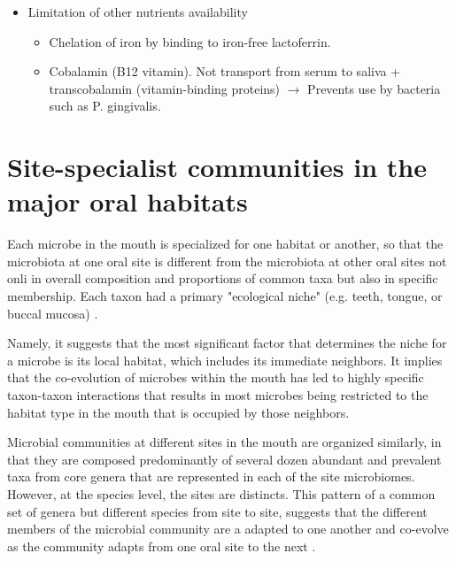 \begin{tcolorbox}[breakable,
    title=Saliva,
    title filled=false,
    colback=blue!5!white,
    colframe=blue!75!black]
\begin{itemize}
\begin{itemize}
        \end{itemize}
        \item Limitation of other nutrients availability
        \begin{itemize}
            \item Chelation of iron by binding to iron-free lactoferrin. 
            \item Cobalamin (B12 vitamin). Not transport from serum to saliva + transcobalamin 
            (vitamin-binding proteins) $\rightarrow$ Prevents use by bacteria such as P. gingivalis. 
        \end{itemize}
    \end{itemize}
\end{tcolorbox}

\section{Site-specialist communities in the major oral habitats}

\begin{definition}
    Each microbe in the mouth is specialized for one habitat or another, so that the microbiota at one oral site is different 
from the microbiota at other oral sites not onli in overall composition and proportions of common taxa but also in specific 
membership. Each taxon had a primary "ecological \gls{niche}" (e.g. teeth, tongue, or buccal mucosa) \cite{Welch2020}.
\end{definition}

Namely, it suggests that the most significant factor that determines the niche for a microbe is its local habitat, which 
includes its immediate neighbors. It implies that the co-evolution of microbes within the mouth has led to highly specific 
taxon-taxon interactions that results in most microbes being restricted to the habitat type in the mouth that is occupied 
by those neighbors.

Microbial communities at different sites in the mouth are organized similarly, in that they are composed predominantly of 
several dozen abundant and prevalent taxa from core genera that are represented in each of the site microbiomes. However, 
at the species level, the sites are distincts. This pattern of a common set of genera but different species from site to 
site, suggests that the different members of the microbial community are a adapted to one another and co-evolve as the 
community adapts from one oral site to the next \cite{Welch2020}. 

